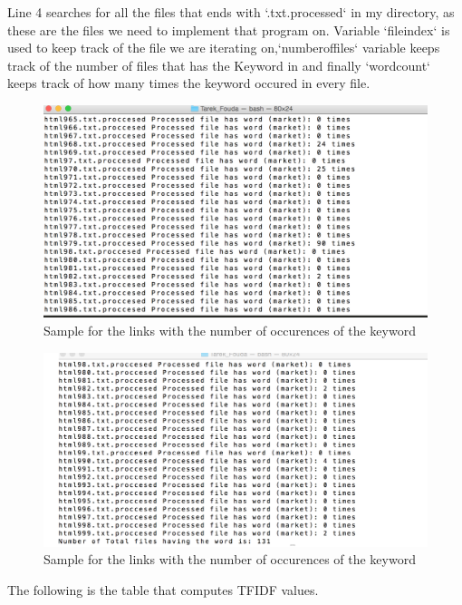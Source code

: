 \documentclass{article}
\begin{document}

Line 4 searches for all the files that ends with `.txt.processed` in my directory, as these are the files we need to implement that program on.
Variable `fileindex` is used to keep track of the file we are iterating on,`numberoffiles` variable keeps track of the number of files that has the Keyword in and finally `wordcount` keeps track of how many times the keyword occured in every file.
\begin{figure}
\centering
\includegraphics[scale=0.45]{1.png}
\caption{Sample for the links with the number of occurences of the keyword}
\label{fig:fig.png}
\end{figure}
\begin{figure}
\centering
\includegraphics[scale=0.45]{2.png}
\caption{Sample for the links with the number of occurences of the keyword}
\label{fig:fig.png}
\end{figure}
The following is the table that computes TFIDF values.
\end{document}
